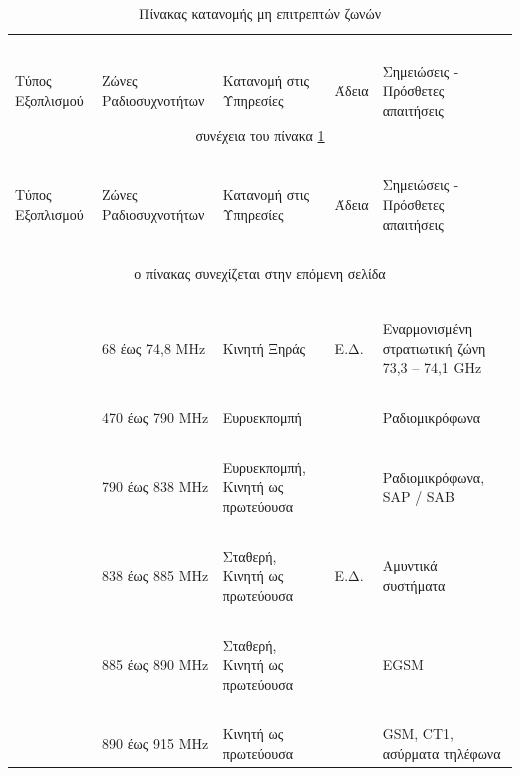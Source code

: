 \documentclass[a4paper, 12pt, twoside]{report}
\begin{document}
{{{{{{			\begin{landscape}	
				\setlength\LTleft{0pt}            %
				\setlength\LTright{0pt}           %
			
			\begin{longtable} { m{3cm} m{4cm} m{4cm} m{3cm} m{5cm} }
					\caption[Πίνακας κατανομής μη επιτρεπτών ζωνών \cite{ΦΕΚ2006Β399, ΦΕΚ2011Β2512}]{Πίνακας κατανομής μη επιτρεπτών ζωνών}
					\label{πιν.:Πίνακας κατανομής μη επιτρεπτών ζωνών}\\
					\hline
					~\\
					Τύπος Εξοπλισμού & Ζώνες Ραδιοσυχνοτήτων & Κατανομή στις Υπηρεσίες & Άδεια & Σημειώσεις - Πρόσθετες απαιτήσεις\\
					\hline
					\endfirsthead
					\multicolumn{5}{c}{συνέχεια του πίνακα \ref{πιν.:Πίνακας κατανομής μη επιτρεπτών ζωνών}}\\
					\hline
					~\\
					Τύπος Εξοπλισμού & Ζώνες Ραδιοσυχνοτήτων & Κατανομή στις Υπηρεσίες & Άδεια & Σημειώσεις - Πρόσθετες απαιτήσεις\\
					\hline
					~\\
					\endhead
					\hline
					\multicolumn{5}{c}{ο πίνακας συνεχίζεται στην επόμενη σελίδα}\\
					\endfoot
					\multicolumn{5}{c}{ολοκληρώθηκε ο πίνακας \ref{πιν.:Πίνακας κατανομής μη ελεύθερων ζωνών}}\\
					\endlastfoot
					~\\
					& 68 έως 74,8 MHz & Κινητή Ξηράς & Ε.Δ. & Εναρμονισμένη στρατιωτική ζώνη 73,3 – 74,1 GHz\\
					\hdashline
					~\\
					& 470 έως 790 MHz & Ευρυεκπομπή & & Ραδιομικρόφωνα\\
					\hdashline
					~\\
					& 790 έως 838 MHz & Ευρυεκπομπή, Κινητή ως πρωτεύουσα & & Ραδιομικρόφωνα, SAP / SAB\\
					\hdashline
					~\\
					& 838 έως 885 MHz & Σταθερή, Κινητή ως πρωτεύουσα &  Ε.Δ. & Αμυντικά συστήματα\\
					\hdashline
					~\\
					& 885 έως 890 MHz & Σταθερή, Κινητή ως πρωτεύουσα & & EGSM\\
					\hdashline
					~\\
					& 890 έως 915 MHz & Κινητή ως πρωτεύουσα & & GSM, CT1, ασύρματα τηλέφωνα\\

\end{longtable}
\end{landscape}}}}}}}
\end{document}
